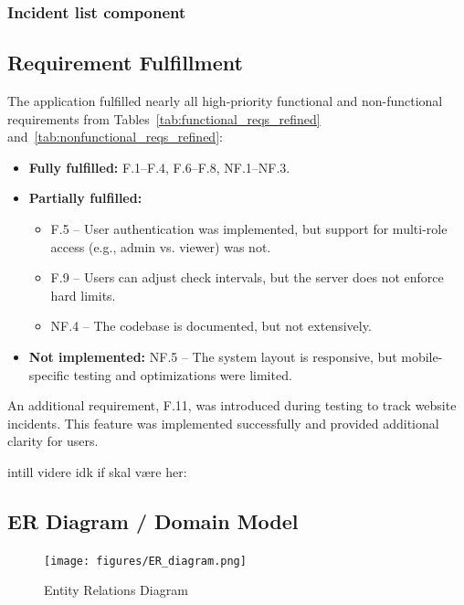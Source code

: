 \subsubsection{Incident list component}



\subsection{Requirement Fulfillment}

The application fulfilled nearly all high-priority functional and non-functional requirements from Tables~\ref{tab:functional_reqs_refined} and~\ref{tab:nonfunctional_reqs_refined}:

\begin{itemize}
    \item \textbf{Fully fulfilled:} F.1–F.4, F.6–F.8, NF.1–NF.3.
    \item \textbf{Partially fulfilled:} 
        \begin{itemize}
            \item F.5 – User authentication was implemented, but support for multi-role access (e.g., admin vs. viewer) was not.
            \item F.9 – Users can adjust check intervals, but the server does not enforce hard limits.
            \item NF.4 – The codebase is documented, but not extensively.
        \end{itemize}
    \item \textbf{Not implemented:} NF.5 – The system layout is responsive, but mobile-specific testing and optimizations were limited.
\end{itemize}

An additional requirement, F.11, was introduced during testing to track website incidents. This feature was implemented successfully and provided additional clarity for users.


intill videre idk if skal være her:

\subsection{ER Diagram / Domain Model}
\begin{figure}[H]
        \centering
        \texttt{[image: figures/ER\_diagram.png]}
        \caption{Entity Relations Diagram}
        \label{sfig:er_diagram}
\end{figure}

